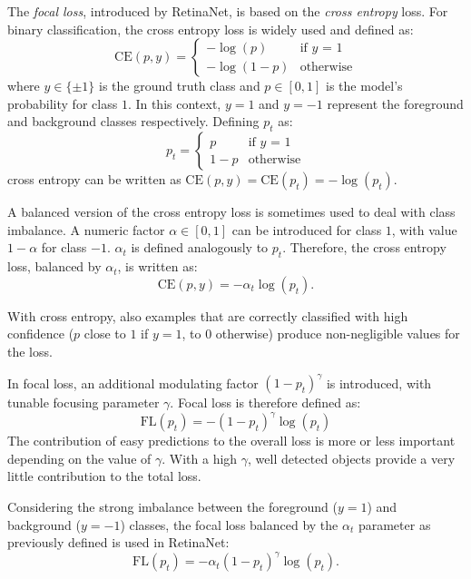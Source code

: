 \documentclass[%
    corpo=12pt,
    twoside,
    stile=classica,   
    tipotesi=magistrale,
    evenboxes,
    english,
	numerazioneromana,
]{toptesi}
\begin{document}
\bigskip
The \textit{focal loss}, introduced by RetinaNet, is based on the \textit{cross entropy} loss. For binary classification, the cross entropy loss is widely used and defined as:
\begin{equation}
	\text{CE}(p,y) = \begin{cases}
		-\log(p) & \text{if $y$ = 1}\\
		-\log(1-p) & \text{otherwise}
	\end{cases}
\end{equation}
where $y\in \{\pm 1\}$ is the ground truth class and $p\in\left[0,1\right]$ is the model's probability for class $1$. In this context, $y=1$ and $y=-1$ represent the foreground and background classes respectively. Defining $p_t$ as:
\begin{equation}
	p_t = \begin{cases}
		p & \text{if $y$ = 1}\\
		1-p & \text{otherwise}
	\end{cases}
\end{equation}
cross entropy can be written as $\text{CE}(p,y) = \text{CE}(p_t) = -\log(p_t)$.

\bigskip
A balanced version of the cross entropy loss is sometimes used to deal with class imbalance. A numeric factor $\alpha\in\left[0,1\right]$ can be introduced for class $1$, with value $1-\alpha$ for class $-1$. $\alpha_t$ is defined analogously to $p_t$. Therefore, the cross entropy loss, balanced by $\alpha_t$, is written as:
\begin{equation}
	\text{CE}(p,y) = -\alpha_t\log(p_t).
\end{equation}

\bigskip
With cross entropy, also examples that are correctly classified with high confidence ($p$ close to $1$ if $y=1$, to $0$ otherwise) produce non-negligible values for the loss.

In focal loss, an additional modulating factor $\left(1-p_t\right)^\gamma$ is introduced, with tunable focusing parameter $\gamma$. Focal loss is therefore defined as:
\begin{equation}
	\text{FL}(p_t) = -\left(1-p_t\right)^\gamma \log(p_t)
\end{equation}
The contribution of easy predictions to the overall loss is more or less important depending on the value of $\gamma$. With a high $\gamma$, well detected objects provide a very little contribution to the total loss.

Considering the strong imbalance between the foreground ($y=1$) and background ($y=-1$) classes, the focal loss balanced by the $\alpha_t$ parameter as previously defined is used in RetinaNet:
\begin{equation}
	\text{FL}(p_t) = -\alpha_t\left(1-p_t\right)^\gamma \log(p_t).
	\label{eq:focalloss}
\end{equation}
\end{document}
